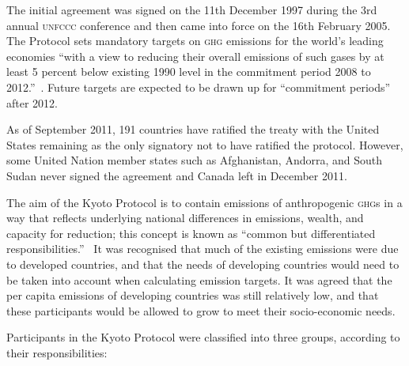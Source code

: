 The initial agreement was signed on the 11th December 1997 during the 3rd annual \textsc{unfccc} conference and then came into force on the 16th February 2005. The Protocol sets mandatory targets on \textsc{ghg} emissions for the world's leading economies ``with a view to reducing their overall emissions of such gases by at least 5 percent below existing 1990 level in the commitment period 2008 to 2012.''~\cite{UNFCCC-98-p1}. Future targets are expected to be drawn up for ``commitment periods'' after 2012.~\cite{UNFCCC-98-p4}

As of September 2011, 191 countries have ratified the treaty with the United States remaining as the only signatory not to have ratified the protocol. However, some United Nation member states such as Afghanistan, Andorra, and South Sudan never signed the agreement and Canada left in December 2011.

The aim of the Kyoto Protocol is to contain emissions of anthropogenic \textsc{ghg}s in a way that reflects underlying national differences in emissions, wealth, and capacity for reduction; this concept is known as ``common but differentiated responsibilities.''~\cite{Grubb-04}\cite{UNFCCC-92} It was recognised that much of the existing \CO emissions were due to developed countries, and that the needs of developing countries would need to be taken into account when calculating emission targets. It was agreed that the per capita emissions of developing countries was still relatively low, and that these participants would be allowed to grow to meet their socio-economic needs.

Participants in the Kyoto Protocol were classified into three groups, according to their responsibilities:~\cite{UNFCCC-92}

